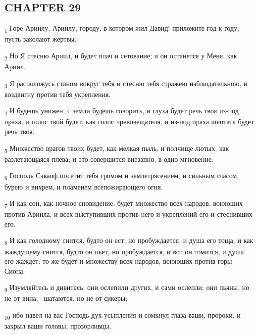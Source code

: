 \subsection{CHAPTER 29}
\begin{tcolorbox}
\textsubscript{1} Горе Ариилу, Ариилу, городу, в котором жил Давид! приложите год к году; пусть заколают жертвы.
\end{tcolorbox}
\begin{tcolorbox}
\textsubscript{2} Но Я стесню Ариил, и будет плач и сетование; и он останется у Меня, как Ариил.
\end{tcolorbox}
\begin{tcolorbox}
\textsubscript{3} Я расположусь станом вокруг тебя и стесню тебя стражею наблюдательною, и воздвигну против тебя укрепления.
\end{tcolorbox}
\begin{tcolorbox}
\textsubscript{4} И будешь унижен, с земли будешь говорить, и глуха будет речь твоя из-под праха, и голос твой будет, как голос чревовещателя, и из-под праха шептать будет речь твоя.
\end{tcolorbox}
\begin{tcolorbox}
\textsubscript{5} Множество врагов твоих будет, как мелкая пыль, и полчище лютых, как разлетающаяся плева; и это совершится внезапно, в одно мгновение.
\end{tcolorbox}
\begin{tcolorbox}
\textsubscript{6} Господь Саваоф посетит тебя громом и землетрясением, и сильным гласом, бурею и вихрем, и пламенем всепожирающего огня.
\end{tcolorbox}
\begin{tcolorbox}
\textsubscript{7} И как сон, как ночное сновидение, будет множество всех народов, воюющих против Ариила, и всех выступивших против него и укреплений его и стеснивших его.
\end{tcolorbox}
\begin{tcolorbox}
\textsubscript{8} И как голодному снится, будто он ест, но пробуждается, и душа его тоща; и как жаждущему снится, будто он пьет, но пробуждается, и вот он томится, и душа его жаждет: то же будет и множеству всех народов, воюющих против горы Сиона.
\end{tcolorbox}
\begin{tcolorbox}
\textsubscript{9} Изумляйтесь и дивитесь: они ослепили других, и сами ослепли; они пьяны, но не от вина, --шатаются, но не от сикеры;
\end{tcolorbox}
\begin{tcolorbox}
\textsubscript{10} ибо навел на вас Господь дух усыпления и сомкнул глаза ваши, пророки, и закрыл ваши головы, прозорливцы.
\end{tcolorbox}
